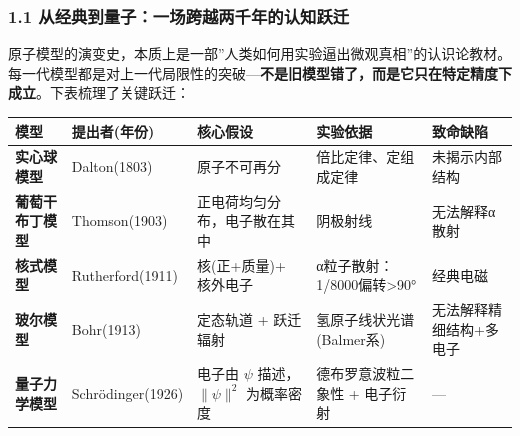 \documentclass[a4paper,11pt]{ctexart}
\newcounter{none}
\newcommand{\箭}{\ensuremath{\rightarrow}}
\newcommand{\左箭}{\ensuremath{\leftarrow}}
\newcommand{\上箭}{\ensuremath{\uparrow}}
\newcommand{\下箭}{\ensuremath{\downarrow}}
\newcommand{\衡}{\ensuremath{\rightleftharpoons}}
\newcommand{\双箭}{\ensuremath{\leftrightarrow}}
\newcommand{\约等于}{\ensuremath{\approx}}
\newcommand{\小于等于}{\ensuremath{\leq}}
\newcommand{\大于等于}{\ensuremath{\geq}}
\newcommand{\不等于}{\ensuremath{\neq}}
\newcommand{\西格马}{\ensuremath{\sigma}}
\newcommand{\派}{\ensuremath{\pi}}
\begin{document}
\subsubsection{1.1 从经典到量子：一场跨越两千年的认知跃迁}\label{ux4eceux7ecfux5178ux5230ux91cfux5b50ux4e00ux573aux8de8ux8d8aux4e24ux5343ux5e74ux7684ux8ba4ux77e5ux8dc3ux8fc1}

原子模型的演变史，本质上是一部''人类如何用实验逼出微观真相''的认识论教材。每一代模型都是对上一代局限性的突破---\textbf{不是旧模型错了，而是它只在特定精度下成立}。下表梳理了关键跃迁：

{\def\LTcaptype{none} %
\begin{longtable}[]{@{}
  >{\raggedright\arraybackslash}p{}
  >{\raggedright\arraybackslash}p{}
  >{\raggedright\arraybackslash}p{}
  >{\raggedright\arraybackslash}p{}
  >{\raggedright\arraybackslash}p{}@{}}
\toprule\noalign{}
\begin{minipage}[b]{\linewidth}\raggedright
模型
\end{minipage} & \begin{minipage}[b]{\linewidth}\raggedright
提出者(年份)
\end{minipage} & \begin{minipage}[b]{\linewidth}\raggedright
核心假设
\end{minipage} & \begin{minipage}[b]{\linewidth}\raggedright
实验依据
\end{minipage} & \begin{minipage}[b]{\linewidth}\raggedright
致命缺陷
\end{minipage} \\
\midrule\noalign{}
\endhead
\bottomrule\noalign{}
\endlastfoot
\textbf{实心球模型} & Dalton(1803) & 原子不可再分 & 倍比定律、定组成定律 & 未揭示内部结构 \\
\textbf{葡萄干布丁模型} & Thomson(1903) & 正电荷均匀分布，电子散在其中 & 阴极射线 & 无法解释α散射 \\
\textbf{核式模型} & Rutherford(1911) & 核(正+质量)+ 核外电子 & α粒子散射：1/8000偏转\textgreater90° & 经典电磁 \\
\textbf{玻尔模型} & Bohr(1913) & 定态轨道 + 跃迁辐射 & 氢原子线状光谱(Balmer系) & 无法解释精细结构+多电子 \\
\textbf{量子力学模型} & Schrödinger(1926) & 电子由 \(\psi\) 描述，\(\|\psi\|^2\) 为概率密度 & 德布罗意波粒二象性 + 电子衍射 & --- \\
\end{longtable}
}
\end{document}
